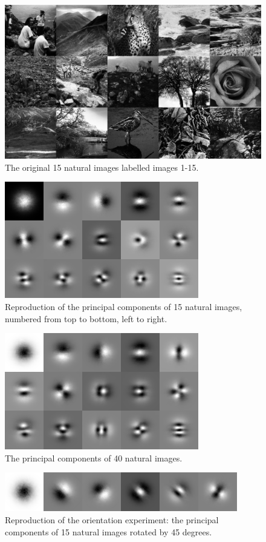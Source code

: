 \begin{figure}
    \centering
    \includegraphics[scale=0.2]{figures/julia-fig1.png}
    \caption{The original 15 natural images labelled images 1-15.}
    \label{fig:Figure1}
\end{figure}

\begin{figure}
    \centering
    \includegraphics[scale=0.75]{figures/julia-fig2.png}
    \caption{Reproduction of the principal components of 15 natural images, numbered from top to bottom, left to right.}
    \label{fig:Figure2}
\end{figure}
\begin{figure}
    \centering
    \includegraphics[scale=0.75]{figures/julia-fig3.png}
    \caption{The principal components of 40 natural images.}
    \label{fig:Figure3}
\end{figure}
\begin{figure}
    \centering
    \includegraphics[scale=0.75]{figures/julia-fig4.png}
    \caption{Reproduction of the orientation experiment: the principal components of 15 natural images rotated by 45 degrees.}
    \label{fig:Figure4}
\end{figure}


